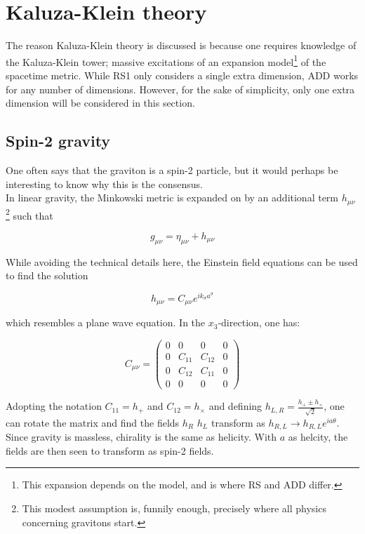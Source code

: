 \documentclass[11pt,a4paper]{article}
\begin{document}
\newpage
\section{Kaluza-Klein theory}
The reason Kaluza-Klein theory is discussed is because one requires knowledge of the Kaluza-Klein tower; massive excitations of an expansion model\footnote{This expansion depends on the model, and is where RS and ADD differ.} of the spacetime metric. While RS1 only considers a single extra dimension, ADD works for any number of dimensions. However, for the sake of simplicity, only one extra dimension will be considered in this section.\\

\subsection{Spin-2 gravity}
One often says that the graviton is a spin-2 particle, but it would perhaps be interesting to know why this is the consensus.\\
In linear gravity, the Minkowski metric is expanded on by an additional term $h_{\mu\nu}$\footnote{This modest assumption is, funnily enough, precisely where all physics concerning gravitons start.} such that

\begin{equation}
	g_{\mu\nu} = \eta_{\mu\nu} + h_{\mu\nu}
	\label{eq:linGrav}
\end{equation}

While avoiding the technical details here, the Einstein field equations can be used to find the solution

\begin{equation}
	h_{\mu\nu} = C_{\mu\nu}e^{ik_\sigma a^\sigma}
\end{equation}

which resembles a plane wave equation. In the $x_3$-direction, one has:

\begin{equation}
	C_{\mu\nu} = \begin{pmatrix}
	0 & 0 & 0 & 0\\
	0 & C_{11} & C_{12} & 0\\
	0 & C_{12} & C_{11} & 0\\
	0 & 0 & 0 & 0
	\end{pmatrix}
\end{equation}

Adopting the notation $C_{11} = h_+$ and $C_{12} = h_{\times}$ and defining $h_{L,R} = \frac{h_+ \pm h_\times}{\sqrt{2}}$, one can rotate the matrix and find the fields $h_R$ $h_L$ transform as $h_{R,L} \rightarrow h_{R,L}e^{ia\theta}$. Since gravity is massless, chirality is the same as helicity. With $a$ as helcity, the fields are then seen to transform as spin-2 fields.
\end{document}
